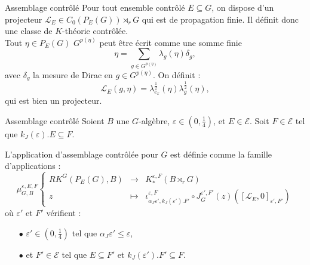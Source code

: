 \begin{frame}{Assemblage contrôlé}
Pour tout ensemble contrôlé $E\subseteq G$, on dispose d'un projecteur $\mathcal L_E\in C_0(P_E(G))\rtimes_r G$ qui est de propagation finie. Il définit donc une classe de $K$-théorie contrôlée.\\
\vspace{0.3 cm}
Tout $\eta\in P_E(G)$  $G^{p(\eta)}$ peut être écrit comme une somme finie 
\[\eta = \sum_{g\in G^{p(\eta)}}\lambda_g(\eta)\delta_g,\]
avec $\delta_g$ la mesure de Dirac en $g\in G^{p(\eta)}$. On définit :
\[\mathcal L_E(g,\eta) = \lambda_{e_x}^{\frac{1}{2}}(\eta)\lambda_g^{\frac{1}{2}}(\eta),\] 
qui est bien un projecteur.
\end{frame}

\begin{frame}{Assemblage contrôlé}
Soient $B$ une $G$-algèbre, $\varepsilon\in (0,\frac{1}{4})$, et $E\in\mathcal E$. Soit $F\in \mathcal E$ tel que $k_J(\varepsilon).E \subseteq F$. 
\begin{definitionfr}
L'application d'assemblage contrôlée pour $G$ est définie comme la famille d'applications :
\[\mu_{G,B}^{\varepsilon,E,F}\left\{
\begin{array}{rcl}
RK^G(P_E(G), B) & \rightarrow & K_*^{\varepsilon, F}(B\rtimes_r G)\\
z & \mapsto & \iota_{\alpha_J\varepsilon', k_J(\varepsilon').F'}^{\varepsilon,F} \circ J_G^{\varepsilon', F'}(z)([\mathcal L_E,0]_{\varepsilon' , F'})
\end{array}\right.\]
où $\varepsilon'$ et $F'$ vérifient :
\begin{itemize}
\item[$\bullet$] $\varepsilon'\in (0,\frac{1}{4})$ tel que $\alpha_J \varepsilon'\leq \varepsilon$,
\item[$\bullet$] et $F'\in\mathcal E$ tel que $E\subseteq F'$ et $k_J(\varepsilon').F'\subseteq F$.
\end{itemize}
\end{definitionfr}
\end{frame}

